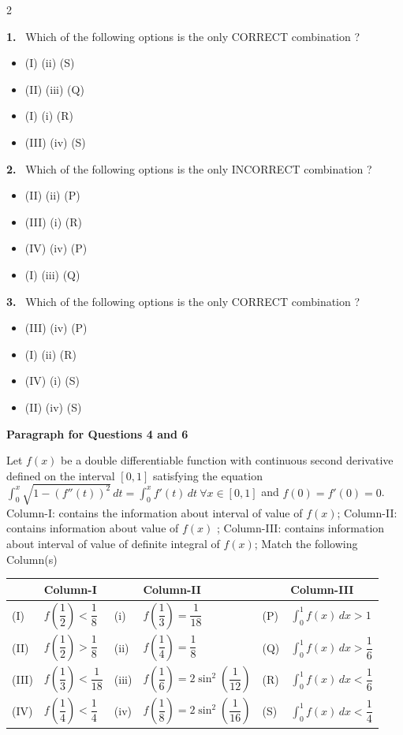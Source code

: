 \documentclass[10pt]{extarticle}
\newcommand{\qn}[1]{\par\smallskip\noindent\textbf{#1.}~}
\newcommand{\paraq}[2]{\par\smallskip\noindent\textbf{Paragraph for Questions #1 and #2}\par}
\newenvironment{qoptions}{\begin{itemize}[leftmargin=1.8em,itemsep=1pt,topsep=2pt,label={}]}{\end{itemize}}
\newcommand{\opt}[2]{\item[(#1)] #2}
\begin{document}
\begin{multicols}{2}
\qn{1} Which of the following options is the only CORRECT combination ?
\begin{qoptions}
\opt{A}{(I) (ii) (S)}
\opt{B}{(II) (iii) (Q)}
\opt{C}{(I) (i) (R)}
\opt{D}{(III) (iv) (S)}
\end{qoptions}
\qn{2} Which of the following options is the only INCORRECT combination ?
\begin{qoptions}
\opt{A}{(II) (ii) (P)}
\opt{B}{(III) (i) (R)}
\opt{C}{(IV) (iv) (P)}
\opt{D}{(I) (iii) (Q)}
\end{qoptions}
\qn{3} Which of the following options is the only CORRECT combination ?
\begin{qoptions}
\opt{A}{(III) (iv) (P)}
\opt{B}{(I) (ii) (R)}
\opt{C}{(IV) (i) (S)}
\opt{D}{(II) (iv) (S)}
\end{qoptions}
\paraq{4}{6}
Let $f(x)$ be a double differentiable function with continuous second derivative defined on the interval $[0,1]$ satisfying the equation $\displaystyle\int_0^x\sqrt{1-(f''(t))^2}\,dt=\int_0^xf'(t)\,dt\ \forall x\in[0,1]$ and $f(0)=f'(0)=0$. Column-I: contains the information about interval of value of $f(x)$; Column-II: contains information about value of $f(x)$ ; Column-III: contains information about interval of value of definite integral of $f(x)$; Match the following Column(s)
\end{multicols}
\begin{center}\small\setlength{\tabcolsep}{4pt}
\begin{tabular}{|p{0.8cm}|p{3cm}|p{0.9cm}|p{4.2cm}|p{0.9cm}|p{3.2cm}|}\hline
 & \textbf{Column-I} & & \textbf{Column-II} & & \textbf{Column-III}\\\hline
(I) & $f\left(\dfrac12\right)<\dfrac18$ & (i) & $f\left(\dfrac13\right)=\dfrac1{18}$ & (P) & $\displaystyle\int_0^1f(x)\,dx>1$\\\hline
(II) & $f\left(\dfrac12\right)>\dfrac18$ & (ii) & $f\left(\dfrac14\right)=\dfrac18$ & (Q) & $\displaystyle\int_0^1f(x)\,dx>\dfrac16$\\\hline
(III) & $f\left(\dfrac13\right)<\dfrac1{18}$ & (iii) & $f\left(\dfrac16\right)=2\sin^2\left(\dfrac1{12}\right)$ & (R) & $\displaystyle\int_0^1f(x)\,dx<\dfrac16$\\\hline
(IV) & $f\left(\dfrac14\right)<\dfrac14$ & (iv) & $f\left(\dfrac18\right)=2\sin^2\left(\dfrac1{16}\right)$ & (S) & $\displaystyle\int_0^1f(x)\,dx<\dfrac14$\\\hline
\end{tabular}
\end{center}
\end{document}
